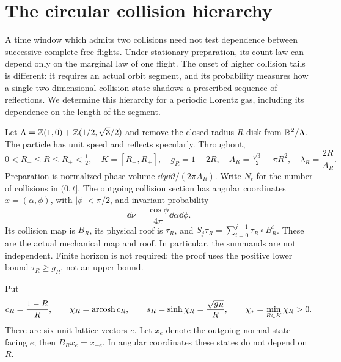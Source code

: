 \section{The circular collision hierarchy}
\label{sec:results}
A time window which admits two collisions need not test dependence between
successive complete free flights. Under stationary preparation, its count
law can depend only on the marginal law of one flight. The onset of higher
collision tails is different: it requires an actual orbit segment, and its
probability measures how a single two-dimensional collision state shadows
a prescribed sequence of reflections. We determine this hierarchy for a
periodic Lorentz gas, including its dependence on the length of the segment.

Let $\Lambda=\mathbb Z(1,0)+\mathbb Z(1/2,\sqrt3/2)$ and remove the closed radius-$R$
disk from $\mathbb R^2/\Lambda$. The particle has unit speed and reflects
specularly. Throughout,
\begin{equation}\label{eq:parameters}
 0<R_-\le R\le R_+<\tfrac12,\quad K=[R_-,R_+],\quad
 g_R=1-2R,\quad A_R=\tfrac{\sqrt3}{2}-\pi R^2,\quad
 \lambda_R=\frac{2R}{A_R}.
\end{equation}
Preparation is normalized phase volume $\dd q\dd\vartheta/(2\pi A_R)$.
Write $N_t$ for the number of collisions in $(0,t]$. The outgoing collision
section has angular coordinates $x=(\alpha,\phi)$, with
$|\phi|<\pi/2$, and invariant probability
\begin{equation}\label{eq:nu}
 \dd\nu=\frac{\cos\phi}{4\pi}\dd\alpha\dd\phi.
\end{equation}
Its collision map is $B_R$, its physical roof is $\tau_R$, and
$S_j\tau_R=\sum_{i=0}^{j-1}\tau_R\circ B_R^i$. These are the actual
mechanical map and roof. In particular, the summands are not independent.
Finite horizon is not required: the proof uses the positive lower bound
$\tau_R\ge g_R$, not an upper bound.

Put
\begin{equation}\label{eq:chi}
 c_R=\frac{1-R}{R},\qquad
 \chi_R=\operatorname{arcosh} c_R,\qquad s_R=\sinh\chi_R=\frac{\sqrt{g_R}}{R},
 \qquad \chi_* =\min_{R\in K}\chi_R>0.
\end{equation}
There are six unit lattice vectors $e$. Let $x_e$ denote the outgoing
normal state facing $e$; then $B_Rx_e=x_{-e}$. In angular coordinates
these states do not depend on $R$.

